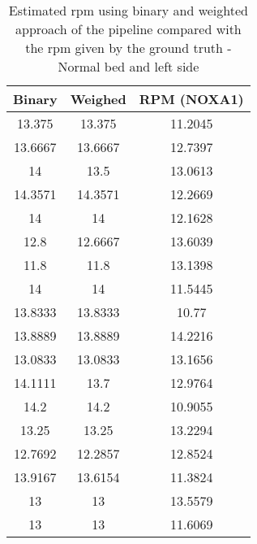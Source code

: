\begin{table}[h]
    \centering
    \begin{tabular}{|c|c|c|}
 
    \hline 
    Binary & Weighed & RPM (NOXA1) \\  
\hline 
13.375    &   13.375  &    11.2045 \\ 
13.6667    &  13.6667  &    12.7397 \\ 
14       &  13.5    &  13.0613 \\ 
14.3571   &   14.3571   &   12.2669 \\ 
14        &   14  &    12.1628 \\ 
12.8     & 12.6667  &    13.6039 \\ 
11.8    &     11.8   &   13.1398 \\ 
14      &     14  &    11.5445 \\ 
13.8333 &     13.8333  &      10.77 \\ 
13.8889   &   13.8889  &    14.2216 \\ 
13.0833    &  13.0833   &   13.1656 \\ 
14.1111   &      13.7   &   12.9764 \\ 
14.2      &   14.2  &    10.9055 \\ 
13.25     &   13.25   &   13.2294 \\ 
12.7692    &  12.2857  &    12.8524 \\ 
13.9167   &   13.6154   &   11.3824 \\ 
13       &    13   &  13.5579 \\ 
13       &    13    &  11.6069 \\ 
\hline 
\end{tabular}
\caption{Estimated rpm using binary and weighted approach of the pipeline
compared with the rpm given by the ground truth
- Normal bed and left side}
\label{tab:LeftNormalStillsg}

\end{table}